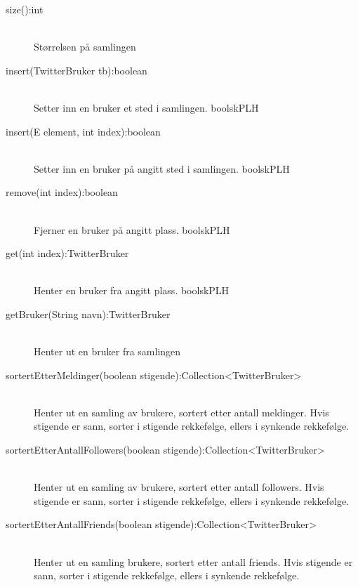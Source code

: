 \documentclass{article}
\begin{document}
\begin{description}
\item [size():int] \ \\
  Størrelsen på samlingen
\item [insert(TwitterBruker tb):boolean] \ \\
  Setter inn en bruker et sted i samlingen. boolskPLH
\item [insert(E element, int index):boolean] \ \\
  Setter inn en bruker på angitt sted i samlingen. boolskPLH
\item [remove(int index):boolean] \ \\
  Fjerner en bruker på angitt plass. boolskPLH
\item [get(int index):TwitterBruker] \ \\
  Henter en bruker fra angitt plass. boolskPLH
\item [getBruker(String navn):TwitterBruker] \ \\
  Henter ut en bruker fra samlingen
\item [sortertEtterMeldinger(boolean stigende):Collection<TwitterBruker>] \ \\
  Henter ut en samling av brukere, sortert etter antall meldinger.
  Hvis stigende er sann, sorter i stigende rekkefølge, ellers i synkende rekkefølge.
\item [sortertEtterAntallFollowers(boolean stigende):Collection<TwitterBruker>] \ \\
  Henter ut en samling av brukere, sortert etter antall followers.
  Hvis stigende er sann, sorter i stigende rekkefølge, ellers i synkende rekkefølge.
\item [sortertEtterAntallFriends(boolean stigende):Collection<TwitterBruker>] \ \\
  Henter ut en samling brukere, sortert etter antall friends.
  Hvis stigende er sann, sorter i stigende rekkefølge, ellers i synkende rekkefølge.
\end{description}

\end{document}
